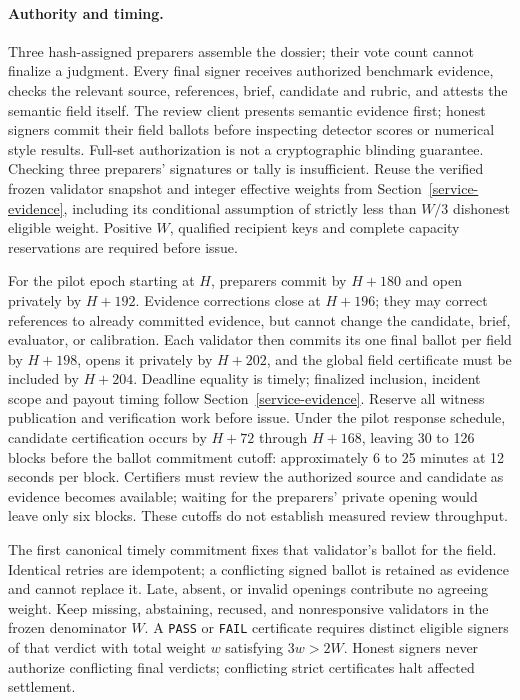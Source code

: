 \paragraph{Authority and timing.}
Three hash-assigned preparers assemble the dossier; their vote count
cannot finalize a judgment. Every final signer receives authorized
benchmark evidence, checks the relevant source, references, brief,
candidate and rubric, and attests the semantic field itself. The review
client presents semantic evidence first; honest signers commit their
field ballots before inspecting detector scores or numerical style
results. Full-set authorization is not a cryptographic blinding guarantee.
Checking
three preparers' signatures or tally is insufficient. Reuse the verified
frozen validator snapshot and integer effective weights from
Section~\ref{service-evidence}, including its conditional assumption of
strictly less than \(W/3\) dishonest eligible weight. Positive \(W\),
qualified recipient keys and complete capacity reservations are required
before issue.

For the pilot epoch starting at \(H\), preparers commit by \(H+180\)
and open privately by \(H+192\). Evidence corrections close at
\(H+196\); they may correct references to already committed evidence,
but cannot change the candidate, brief, evaluator, or calibration.
Each validator then commits its one final ballot per field by
\(H+198\), opens it privately by \(H+202\), and the global field
certificate must be included by \(H+204\). Deadline equality is timely;
finalized inclusion, incident scope and payout timing follow
Section~\ref{service-evidence}. Reserve all witness publication and
verification work before issue. Under the pilot response schedule,
candidate certification occurs by \(H+72\) through \(H+168\), leaving
30 to 126 blocks before the ballot commitment cutoff: approximately
6 to 25 minutes at 12 seconds per block. Certifiers must review the
authorized source and candidate as evidence becomes available; waiting
for the preparers' private opening would leave only six blocks.
These cutoffs do not establish measured review throughput.

The first canonical timely commitment fixes that validator's ballot for
the field. Identical retries are idempotent; a conflicting signed ballot
is retained as evidence and cannot replace it. Late, absent, or invalid
openings contribute no agreeing weight. Keep missing, abstaining,
recused, and nonresponsive validators in the frozen denominator \(W\).
A \texttt{PASS} or \texttt{FAIL} certificate requires distinct eligible
signers of that verdict with total weight \(w\) satisfying
\(3w>2W\). Honest signers never authorize conflicting final verdicts;
conflicting strict certificates halt affected settlement.

